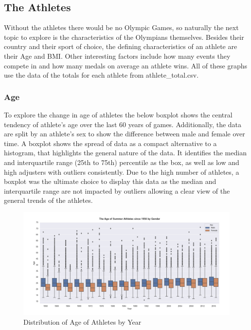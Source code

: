 \documentclass[a4 paper, 12pt]{article}
\begin{document}
    \subsection{The Athletes}
    Without the athletes there would be no Olympic Games, so naturally the next topic to explore is the characteristics of the Olympians themselves. Besides their country and their sport of choice, the defining characteristics of an athlete are their Age and BMI. Other interesting factors include how many events they compete in and how many medals on average an athlete wins. All of these graphs use the data of the totals for each athlete from athlete\_total.csv.
    
        \subsubsection{Age}
        To explore the change in age of athletes the below boxplot shows the central tendency of athlete's age over the last 60 years of games. Additionally, the data are split by an athlete's sex to show the difference between male and female over time. A boxplot shows the spread of data as a compact alternative to a histogram, that highlights the general nature of the data. It identifies the median and interquartile range (25th to 75th) percentile as the box, as well as low and high adjusters with outliers consistently. Due to the high number of athletes, a boxplot was the ultimate choice to display this data as the median and interquartile range are not impacted by outliers allowing a clear view of the general trends of the athletes. 
        \begin{figure} [H]
            \centering
            \includegraphics[width=\textwidth, frame]
                {./images/graph/athlete_age_boxplot.png}      
                \caption{Distribution of Age of Athletes by Year} 
        \end{figure}
         
\end{document}

